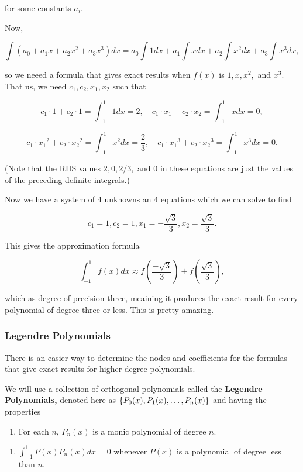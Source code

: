 \documentclass{article}
\begin{document}
for some constants $a_i.$

Now,

\[ \int (a_0 + a_1x + a_2x^2 + a_3x^3) dx  = a_0 \int 1 dx + a_1 \int x dx + a_2 \int x^2 dx + a_3 \int x^3 dx, \]

so we neeed a formula that gives exact results when $f(x)$ is $1, x, x^2,$ and $x^3.$ That us, we need $c_1, c_2, x_1, x_2$ such that

\[ c_1 \cdot 1 + c_2 \cdot 1 = \int_{-1}^1 1 dx = 2, \quad c_1 \cdot x_1 + c_2 \cdot x_2 = \int_{-1}^{1} x dx = 0, \]

\[ c_1 \cdot {x_1}^2 + c_2 \cdot {x_2}^2 = \int_{-1}^1 x^2 dx = \frac{2}{3}, \quad c_1 \cdot {x_1}^3 + c_2 \cdot {x_2}^3 = \int_{-1}^{1} x^3 dx = 0. \]

(Note that the RHS values $2, 0, 2/3,$ and $0$ in these equations are just the values of the preceding definite integrals.)

Now we have a system of $4$ unknowns an $4$ equations which we can solve to find

\[ c_1 = 1, c_2 = 1, x_1 = -\frac{\sqrt{3}}{3}, x_2 = \frac{\sqrt{3}}{3}. \]

This gives the approximation formula

\[ \int_{-1}^{1} f(x) dx \approx f(\frac{-\sqrt{3}}{3}) + f(\frac{\sqrt{3}}{3}), \]

which as degree of precision three, meaining it produces the exact result for every polynomial of degree three or less. This is pretty amazing.

\subsubsection{Legendre Polynomials}

There is an easier way to determine the nodes and coefficients for the formulas that give exact results for higher-degree polynomials.

We will use a collection of orthogonal polynomials called the \textbf{Legendre Polynomials,} denoted here as $\left\{ P_0(x), P_1(x), \dots, P_n(x) \right\}$ and having the properties

\begin{enumerate}
\item For each $n$, $P_n(x)$ is a monic polynomial of degree $n.$
\end{enumerate}

\begin{enumerate}
\item $\int_{-1}^{1}P(x)P_n(x)dx = 0$ whenever $P(x)$ is a polynomial of degree less than $n.$
\end{enumerate}
\end{document}
